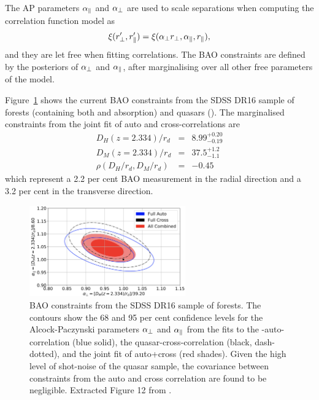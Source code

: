 The AP parameters ${\alpha_\parallel}$ and ${\alpha_\perp}$ are used to scale separations when 
computing the correlation function model as
\begin{equation}
    \xi(r'_\perp, r'_\parallel)  = \xi({\alpha_\perp} {r_\perp}, {\alpha_\parallel}, {r_\parallel}),
\end{equation}
and they are let free when fitting correlations. 
The BAO constraints are defined by the posteriors of ${\alpha_\perp}$ and ${\alpha_\parallel}$, 
after marginalising over all other free parameters of the model. 


Figure~\ref{fig:baolya_dr16} shows the current BAO constraints from the 
SDSS DR16 sample of \lya forests (containing both \lya and \lyb absorption) 
and quasars (\cite{dumasdesbourbouxhelionCompletedSDSSIVExtended2020}). 
The marginalised constraints from the joint fit of 
auto and cross-correlations are 
\begin{eqnarray}
    D_H(z = 2.334)/r_d & = & 8.99^{+0.20}_{-0.19} \\ 
    D_M(z = 2.334)/r_d & = & 37.5^{+1.2}_{-1.1} \\
    \rho( D_H/r_d, D_M/r_d) & = & -0.45 
\end{eqnarray}
which represent a 2.2 per cent BAO measurement in the radial direction 
and a 3.2 per cent in the transverse direction. 


\begin{figure}[!th][t]
\centering 
\includegraphics[width=0.6\textwidth]{fig/forests/baolya_dr16.png}
\caption{BAO constraints from the SDSS DR16 sample of \lya forests. 
The contours show the 68 and 95 per cent confidence levels for the 
Alcock-Paczynski parameters ${\alpha_\perp}$ and ${\alpha_\parallel}$ from the fits to 
the \lya-\lya auto-correlation (blue solid), 
the quasar-\lya cross-correlation (black, dash-dotted), and the  
joint fit of auto+cross (red shades).
Given the high level of shot-noise of the quasar sample, the 
covariance between constraints from the auto and cross correlation are found to be 
negligible.
Extracted Figure 12 from \cite{dumasdesbourbouxhelionCompletedSDSSIVExtended2020}.}
\label{fig:baolya_dr16}
\end{figure}




